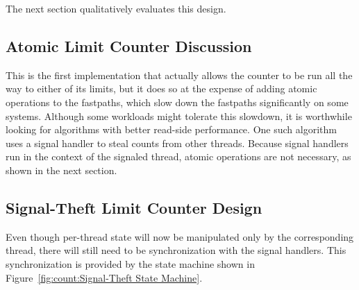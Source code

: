 \QuickQuizEnd

The next section qualitatively evaluates this design.

\subsection{Atomic Limit Counter Discussion}

This is the first implementation that actually allows the counter to
be run all the way to either of its limits, but it does so at the
expense of adding atomic operations to the fastpaths, which slow down
the fastpaths significantly on some systems.
Although some workloads might tolerate this slowdown, it is worthwhile
looking for algorithms with better read-side performance.
One such algorithm uses a signal handler to steal counts from other
threads.
Because signal handlers run in the context of the signaled thread,
atomic operations are not necessary, as shown in the next section.

\QuickQuizEnd

\subsection{Signal-Theft Limit Counter Design}
\label{sec:count:Signal-Theft Limit Counter Design}

Even though per-thread state will now be manipulated only by the
corresponding thread, there will still need to be synchronization
with the signal handlers.
This synchronization is provided by the state machine shown in
Figure~\ref{fig:count:Signal-Theft State Machine}.

